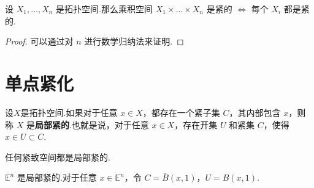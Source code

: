 \begin{corollary}[Tychonoff 定理]
    设 $X_1, \dots, X_n$ 是拓扑空间.那么乘积空间 $X_1 \times \dots \times X_n$ 是紧的 $\iff$ 每个 $X_i$ 都是紧的.
\end{corollary}
\begin{proof}
    可以通过对 $n$ 进行数学归纳法来证明.
\end{proof}

\section{单点紧化}

\begin{definition}[局部紧空间]
    设$X$是拓扑空间.如果对于任意 $x \in X$，都存在一个紧子集 $C$，其内部包含 $x$，则称 $X$ 是\textbf{局部紧的}.也就是说，对于任意 $x \in X$，存在开集 $U$ 和紧集 $C$，使得 $x \in U \subset C$.
\end{definition}

\begin{instance}
    任何紧致空间都是局部紧的.
\end{instance}

\begin{instance}
    $\mathbb{E}^n$ 是局部紧的.对于任意 $x \in \mathbb{E}^n$，令 $C = \bar{B}(x, 1)$，$U = B(x, 1)$.
\end{instance}

